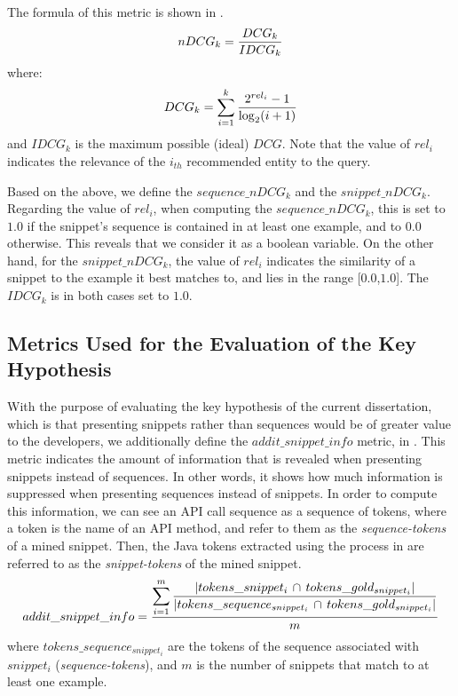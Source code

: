 The formula of this metric is shown in .
\vspace{1ex}
%
\begin{equation}
 \label{eq:ndcg}
 \centering
  nDCG_k = 
  \frac{ DCG_k } { IDCG_k }
\end{equation}
%
where:
\vspace{1ex}
%
\begin{equation*}
 \centering
  DCG_k = \displaystyle\sum_{i=1}^k
  \frac{  2^{rel_i}-1 } 
       { \log_2 (i+1) }
  \vspace{1.5ex}
\end{equation*}
%
\normalsize
and $IDCG_k$ is the maximum possible (ideal) $DCG$. Note that the value of $rel_i$ indicates the relevance of the $i_{th}$ recommended entity to the query.

Based on the above, we define the $sequence\_nDCG_k$ and the $snippet\_nDCG_k$. Regarding the value of $rel_i$, when computing the $sequence\_nDCG_k$, this is set to $1.0$ if the snippet's sequence is contained in at least one example, and to $0.0$ otherwise. This reveals that we consider it as a boolean variable. On the other hand, for the $snippet\_nDCG_k$, the value of $rel_i$ indicates the similarity of a snippet to the example it best matches to, and lies in the range [$0.0$,$1.0$]. The $IDCG_k$ is in both cases set to $1.0$.


\subsection{Metrics Used for the Evaluation of the Key Hypothesis}
\label{subsec:evaluation-key-hypothesis}

With the purpose of evaluating the key hypothesis of the current dissertation, which is that presenting snippets rather than sequences would be of greater value to the developers, we additionally define the $addit\_snippet\_info$ metric, in . This metric indicates the amount of information that is revealed when presenting snippets instead of sequences. In other words, it shows how much information is suppressed when presenting sequences instead of snippets. In order to compute this information, we can see an API call sequence as a sequence of tokens, where a token is the name of an API method, and refer to them as the \textit{sequence-tokens} of a mined snippet. Then, the Java tokens extracted using the process in  are referred to as the \textit{snippet-tokens} of the mined snippet.
\vspace{1ex}
%
\begin{equation}
 \label{eq:addit-info}
 \centering
  addit\_snippet\_info = 
  \frac{ \displaystyle\sum_{i=1}^{m} 
  	\frac{ | tokens\_snippet_i \, \cap \, tokens\_gold_{snippet_i} |}
  		 { | tokens\_sequence_{snippet_i} \, \cap \, tokens\_gold_{snippet_i} | } }
       { m }
 \vspace{0.5ex}
\end{equation}
%
where $tokens\_sequence_{snippet_i}$ are the tokens of the sequence associated with $snippet_i$ (\textit{sequence-tokens}), and $m$ is the number of snippets that match to at least one example.


